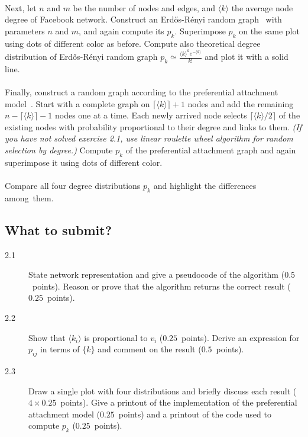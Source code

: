 \documentclass[11pt,a4paper]{article}
\newcommand{\avg}[1]{\langle#1\rangle}
\newcommand{\hint}[1]{{\it (#1)}}
\newcommand{\points}[1]{({\color{magenta}$#1$~points})}
\begin{document}
\paragraph{} Next, let $n$ and $m$ be the number of nodes and edges, and $\avg{k}$ the average node degree of Facebook network. Construct an Erd\H{o}s-R\'{e}nyi random graph~\cite{ER59} with parameters $n$ and $m$, and again compute its $p_k$. Superimpose $p_k$ on the same plot using dots of different color as before. Compute also theoretical degree distribution of Erd\H{o}s-R\'{e}nyi random graph $p_k\simeq\frac{\avg{k}^ke^{-\avg{k}}}{k!}$ and plot it with a solid line. 


\paragraph{} Finally, construct a random graph according to the preferential attachment model~\cite{BA99}. Start with a complete graph on $\lceil\avg{k}\rceil+1$ nodes and add the remaining $n-\lceil\avg{k}\rceil-1$ nodes one at a time. Each newly arrived node selects $\lceil\avg{k}/2\rceil$ of the existing nodes with probability proportional to their degree and links to them. \hint{If you have not solved exercise 2.1, use linear roulette wheel algorithm for random selection by degree.} Compute $p_k$ of the preferential attachment graph and again superimpose it using dots of different color. 

\paragraph{} Compare all four degree distributions $p_k$ and highlight the differences among~them.

\subsection*{What to submit?}

\begin{description}
	\item[2.1] State network representation and give a pseudocode of the algorithm \points{0.5}. Reason or prove that the algorithm returns the correct result \points{0.25}.
	\item[2.2] Show that $\avg{k_i}$ is proportional to $v_i$ \points{0.25}. Derive an expression for $p_{ij}$ in terms of $\{k\}$ and comment on the result \points{0.5}.
	\item[2.3] Draw a single plot with four distributions and briefly discuss each result \points{4\times 0.25}. Give a printout of the implementation of the preferential attachment model \points{0.25} and a printout of the code used to compute $p_k$ \points{0.25}.
\end{description}
\end{document}
